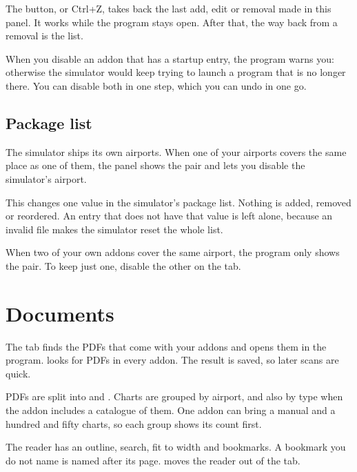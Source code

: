 \documentclass[11pt,a4paper]{article}
\begin{document}

The  button, or Ctrl+Z, takes back the last add, edit or removal made
in this panel. It works while the program stays open. After that, the way back
from a removal is the  list.

When you disable an addon that has a startup entry, the program warns you:
otherwise the simulator would keep trying to launch a program that is no longer
there. You can disable both in one step, which you can undo in one go.

\subsection{Package list}

The simulator ships its own airports. When one of your airports covers the same
place as one of them, the  panel shows the pair and lets you
disable the simulator's airport.

This changes one value in the simulator's package list. Nothing is added,
removed or reordered. An entry that does not have that value is left alone,
because an invalid file makes the simulator reset the whole list.

When two of your own addons cover the same airport, the program only shows the
pair. To keep just one, disable the other on the  tab.

\section{Documents}

The  tab finds the PDFs that come with your addons and opens them
in the program.  looks for PDFs in every addon. The result
is saved, so later scans are quick.

PDFs are split into  and . Charts are grouped by
airport, and also by type when the addon includes a catalogue of them. One
addon can bring a manual and a hundred and fifty charts, so each group shows
its count first.

The reader has an outline, search, fit to width and bookmarks. A bookmark you do
not name is named after its page.  moves the reader
out of the tab.

\end{document}
